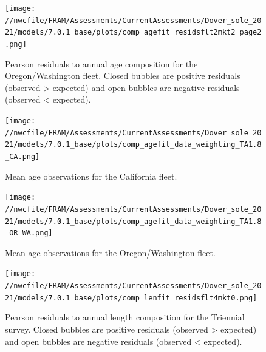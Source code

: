 \documentclass[11pt,
  english,
  a4paper,
]{article}
\begin{document}
\tagmcend\tagstructend


\begin{figure}
\centering
\texttt{[image: //nwcfile/FRAM/Assessments/CurrentAssessments/Dover\_sole\_2021/models/7.0.1\_base/plots/comp\_agefit\_residsflt2mkt2\_page2.png]}
\caption{Pearson residuals to annual age composition for the Oregon/Washington fleet. Closed bubbles are positive residuals (observed \textgreater{} expected) and open bubbles are negative residuals (observed \textless{} expected).\label{fig:orwa-pearson-age}}
\end{figure}

\tagmcend\tagstructend


\begin{figure}
\centering
\texttt{[image: //nwcfile/FRAM/Assessments/CurrentAssessments/Dover\_sole\_2021/models/7.0.1\_base/plots/comp\_agefit\_data\_weighting\_TA1.8\_CA.png]}
\caption{Mean age observations for the California fleet.\label{fig:ca-mean-age}}
\end{figure}

\tagmcend\tagstructend


\begin{figure}
\centering
\texttt{[image: //nwcfile/FRAM/Assessments/CurrentAssessments/Dover\_sole\_2021/models/7.0.1\_base/plots/comp\_agefit\_data\_weighting\_TA1.8\_OR\_WA.png]}
\caption{Mean age observations for the Oregon/Washington fleet.\label{fig:orwa-mean-age}}
\end{figure}

\tagmcend\tagstructend


\begin{figure}
\centering
\texttt{[image: //nwcfile/FRAM/Assessments/CurrentAssessments/Dover\_sole\_2021/models/7.0.1\_base/plots/comp\_lenfit\_residsflt4mkt0.png]}
\caption{Pearson residuals to annual length composition for the Triennial survey. Closed bubbles are positive residuals (observed \textgreater{} expected) and open bubbles are negative residuals (observed \textless{} expected).\label{fig:tri-pearson}}
\end{figure}
\end{document}

